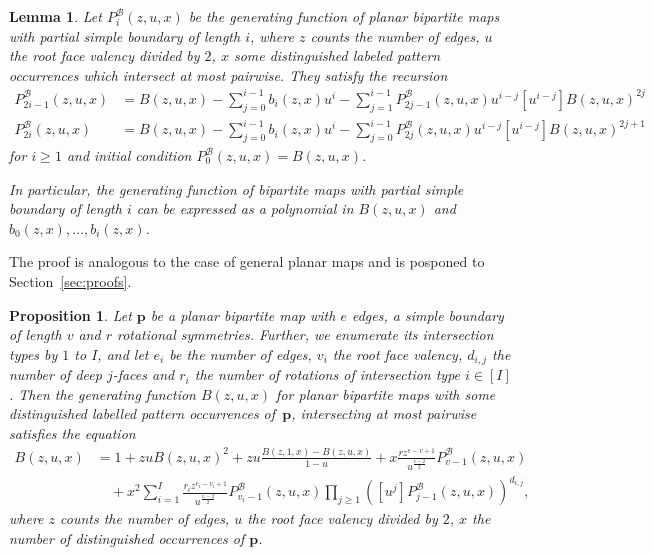 \documentclass[reqno, 11pt]{amsart}
\newtheorem{proposition}{Proposition}
\newtheorem{lemma}{Lemma}
\theoremstyle{definition}
\theoremstyle{remark}
\newcommand{\map}[1]{\textbf{#1}}
\numberwithin{equation}{section}
\begin{document}
\begin{lemma}\label{lem:partial}
	Let $P^\mathcal{B}_i(z,u,x)$ be the generating function of planar bipartite maps with partial simple boundary of length $i$, where $z$ counts the number of edges, $u$ the root face valency divided by $2$, $x$ some distinguished labeled pattern occurrences which intersect at most pairwise. They satisfy the recursion
	\begin{align*}
		P^{\mathcal{B}}_{2i-1}(z,u,x) &= B(z,u,x)-\sum_{j=0}^{i-1}b_{i}(z,x)u^{i}-\sum_{j=1}^{i-1}P^{\mathcal{B}}_{2j-1}(z,u,x)u^{i-j}[u^{i-j}]B(z,u,x)^{2j}\\
		P^{\mathcal{B}}_{2i}(z,u,x) &= B(z,u,x)-\sum_{j=0}^{i-1}b_{i}(z,x)u^{i}-\sum_{j=0}^{i-1}P^{\mathcal{B}}_{2j}(z,u,x)u^{i-j}[u^{i-j}]B(z,u,x)^{2j+1}
	\end{align*}
    for $i\geq 1$ and initial condition $P^{\mathcal{B}}_{0}(z,u,x) = B(z,u,x)$. 
    
    In particular, the generating function of bipartite maps with partial simple boundary of length $i$ can be expressed as a polynomial in $B(z,u,x)$ and $b_0(z,x),\dots,b_i(z,x)$.
\end{lemma}

The proof is analogous to the case of general planar maps and is posponed to Section~\ref{sec:proofs}.

\begin{proposition}\label{prop:bip}
    Let $\map{p}$ be a planar bipartite map with $e$ edges, a simple boundary of length $v$ and $r$ rotational symmetries. Further, we enumerate its intersection types by $1$ to $I$, and let $e_i$ be the number of edges, $v_i$ the root face valency, $d_{i,j}$ the number of deep $j$-faces and $r_i$ the number of rotations of intersection type $i \in [I]$. Then the generating function $B(z,u,x)$ for planar bipartite maps with some distinguished labelled pattern occurrences of~$\map{p}$, intersecting at most pairwise satisfies the equation
    \begin{align}
        B(z,u,x) &= 1+zuB(z,u,x)^2 + zu\frac{B(z,1,x)-B(z,u,x)}{1-u} + x\frac{rz^{e-v+1}}{u^{\frac{v-2}{2}}}P^\mathcal{B}_{v-1}(z,u,x)\nonumber \\
        &\quad+ x^2\sum_{i=1}^I \frac{r_iz^{e_i-v_i+1}}{u^{\frac{v_i-2}{2}}}P^\mathcal{B}_{v_i-1}(z,u,x)\prod_{j\geq 1}\left([u^j]P_{j-1}^{\mathcal{B}}(z,u,x)\right)^{d_{i,j}}, \label{eq:bipartite}
    \end{align}
    where $z$ counts the number of edges, $u$ the root face valency divided by $2$, $x$ the number of distinguished occurrences of $\map{p}$.
\end{proposition}
\end{document}
